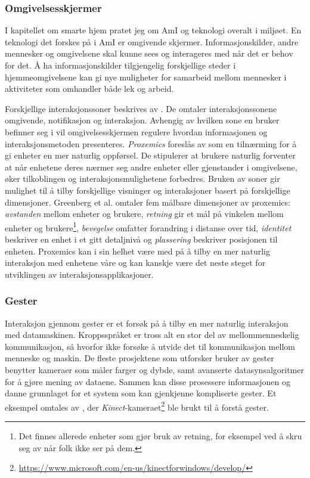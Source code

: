 \subsubsection*{Omgivelsesskjermer}
I kapitellet om smarte hjem pratet jeg om AmI og teknologi overalt i miljøet. En teknologi det forskes på i AmI er omgivende skjermer. Informasjonskilder, andre mennesker og omgivelsene skal kunne sees og interageres med når det er behov for det. Å ha informasjonskilder tilgjengelig forskjellige steder i hjemmeomgivelsene kan gi nye muligheter for samarbeid mellom mennesker i aktiviteter som omhandler både lek og arbeid.

Forskjellige interaksjonssoner beskrives av \citet{streitz05}. De omtaler interaksjonssonene omgivende, notifikasjon og interaksjon. Avhengig av hvilken sone en bruker befinner seg i vil omgivelsesskjermen regulere hvordan informasjonen og interaksjonsmetoden presenteres. \emph{Proxemics} foreslås av \citet{greenberg11} som en tilnærming for å gi enheter en mer naturlig oppførsel. De stipulerer at brukere naturlig forventer at når enhetene deres nærmer seg andre enheter eller gjenstander i omgivelsene, øker tilkoblingen og interaksjonsmulighetene forbedres. Bruken av soner gir mulighet til å tilby forskjellige visninger og interaksjoner basert på forskjellige dimensjoner. Greenberg et al. omtaler fem målbare dimensjoner av proxemics: \emph{avstanden} mellom enheter og brukere, \emph{retning} gir et mål på vinkelen mellom enheter og brukere\footnote{Det finnes allerede enheter som gjør bruk av retning, for eksempel ved å skru seg av når folk ikke ser på dem.}, \emph{bevegelse} omfatter forandring i distanse over tid, \emph{identitet} beskriver en enhet i et gitt detaljnivå og \emph{plassering} beskriver posisjonen til enheten. Proxemics kan i sin helhet være med på å tilby en mer naturlig interaksjon med enhetene våre og kan kanskje være det neste steget for utviklingen av interaksjonsapplikasjoner.\\

\subsubsection*{Gester}
Interaksjon gjennom gester er et forsøk på å tilby en mer naturlig interaksjon med datamaskinen. Kroppsspråket er tross alt en stor del av mellommenneskelig kommunikasjon, så hvorfor ikke forsøke å utvide det til kommunikasjon mellom menneske og maskin. De fleste prosjektene som utforsker bruker av gester benytter kameraer som måler farger og dybde, samt avanserte datasynsalgoritmer for å gjøre mening av dataene. Sammen kan disse prosessere informasjonen og danne grunnlaget for et system som kan gjenkjenne kompliserte gester. Et eksempel omtales av \citet{homeos}, der \emph{Kinect}-kameraet\footnote{\url{https://www.microsoft.com/en-us/kinectforwindows/develop/}} ble brukt til å forstå gester.

